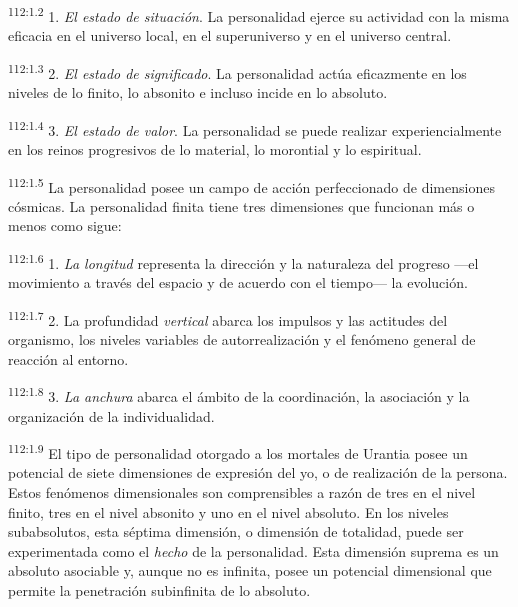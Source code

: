 \documentclass[twoside, 11pt]{book}
\begin{document}
\par
\textsuperscript{112:1.2} 1. \textit{El estado de situación}. La personalidad ejerce su actividad con la misma eficacia en el universo local, en el superuniverso y en el universo central.

\par
\textsuperscript{112:1.3} 2. \textit{El estado de significado}. La personalidad actúa eficazmente en los niveles de lo finito, lo absonito e incluso incide en lo absoluto.

\par
\textsuperscript{112:1.4} 3. \textit{El estado de valor}. La personalidad se puede realizar experiencialmente en los reinos progresivos de lo material, lo morontial y lo espiritual.

\par
\textsuperscript{112:1.5} La personalidad posee un campo de acción perfeccionado de dimensiones cósmicas. La personalidad finita tiene tres dimensiones que funcionan más o menos como sigue:

\par
\textsuperscript{112:1.6} 1. \textit{La longitud} representa la dirección y la naturaleza del progreso ---el movimiento a través del espacio y de acuerdo con el tiempo--- la evolución.

\par
\textsuperscript{112:1.7} 2. La profundidad \textit{vertical} abarca los impulsos y las actitudes del organismo, los niveles variables de autorrealización y el fenómeno general de reacción al entorno.

\par
\textsuperscript{112:1.8} 3. \textit{La anchura} abarca el ámbito de la coordinación, la asociación y la organización de la individualidad.

\par
\textsuperscript{112:1.9} El tipo de personalidad otorgado a los mortales de Urantia posee un potencial de siete dimensiones de expresión del yo, o de realización de la persona. Estos fenómenos dimensionales son comprensibles a razón de tres en el nivel finito, tres en el nivel absonito y uno en el nivel absoluto. En los niveles subabsolutos, esta séptima dimensión, o dimensión de totalidad, puede ser experimentada como el \textit{hecho} de la personalidad. Esta dimensión suprema es un absoluto asociable y, aunque no es infinita, posee un potencial dimensional que permite la penetración subinfinita de lo absoluto.
\end{document}
